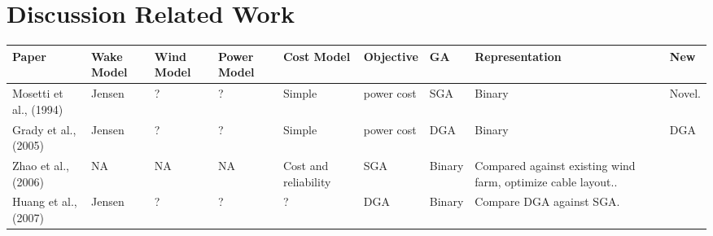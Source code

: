 \section{Discussion Related Work}


\begin{table}
\tiny
\centering
\begin{tabular}{l|l|l|l|l|l|l|l|l}
Paper & Wake Model & Wind Model & Power Model & Cost Model & Objective & GA & Representation & New  \\ 
\hline 
Mosetti et al., (1994) & Jensen & ? &  ? & Simple & power cost & SGA & Binary & Novel. \\ 
Grady et al., (2005)    & Jensen & ? & ? & Simple & power cost & DGA & Binary & DGA \\ 
Zhao et al., (2006) & NA & NA & NA & Cost and reliability & SGA & Binary & Compared against existing wind farm, optimize cable layout.. \\ 
Huang et al., (2007) & Jensen & ? & ? & ? & DGA & Binary & Compare DGA against SGA. \\ 
\end{tabular} 
\end{table}



